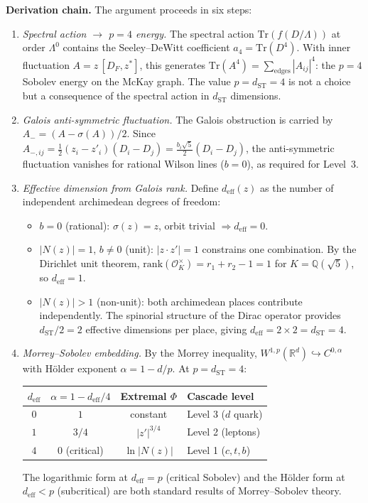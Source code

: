 \documentclass[12pt,a4paper]{article}
\theoremstyle{definition}
\begin{document}
\textbf{Derivation chain.}  The argument proceeds in six steps:

\begin{enumerate}
\item[(A)] \emph{Spectral action $\to$ $p = 4$ energy.}  The spectral action $\mathrm{Tr}(f(D/\Lambda))$ at order $\Lambda^0$ contains the Seeley--DeWitt coefficient $a_4 = \mathrm{Tr}(D^4)$.  With inner fluctuation $A = z\,[D_F, z^*]$, this generates $\mathrm{Tr}(A^4) = \sum_{\text{edges}} |A_{ij}|^4$: the $p = 4$ Sobolev energy on the McKay graph.  The value $p = d_{\text{ST}} = 4$ is not a choice but a consequence of the spectral action in $d_{\text{ST}}$ dimensions.

\item[(B)] \emph{Galois anti-symmetric fluctuation.}  The Galois obstruction is carried by $A_- = (A - \sigma(A))/2$.  Since $A_{-,ij} = \tfrac{1}{2}(z_i - z'_i)(D_i - D_j) = \tfrac{b_i\sqrt{5}}{2}(D_i - D_j)$, the anti-symmetric fluctuation vanishes for rational Wilson lines ($b = 0$), as required for Level~3.

\item[(C)] \emph{Effective dimension from Galois rank.}  Define $d_{\text{eff}}(z)$ as the number of independent archimedean degrees of freedom:
\begin{itemize}
\item $b = 0$ (rational): $\sigma(z) = z$, orbit trivial $\Rightarrow d_{\text{eff}} = 0$.
\item $|N(z)| = 1$, $b \neq 0$ (unit): $|z \cdot z'| = 1$ constrains one combination.  By the Dirichlet unit theorem, $\mathrm{rank}(\mathcal{O}_K^\times) = r_1 + r_2 - 1 = 1$ for $K = \mathbb{Q}(\sqrt{5})$, so $d_{\text{eff}} = 1$.
\item $|N(z)| > 1$ (non-unit): both archimedean places contribute independently.  The spinorial structure of the Dirac operator provides $d_{\text{ST}}/2 = 2$ effective dimensions per place, giving $d_{\text{eff}} = 2 \times 2 = d_{\text{ST}} = 4$.
\end{itemize}

\item[(D)] \emph{Morrey--Sobolev embedding.}  By the Morrey inequality, $W^{1,p}(\mathbb{R}^d) \hookrightarrow C^{0,\alpha}$ with H\"{o}lder exponent $\alpha = 1 - d/p$.  At $p = d_{\text{ST}} = 4$:
\begin{center}
\begin{tabular}{cccl}
\toprule
$d_{\text{eff}}$ & $\alpha = 1 - d_{\text{eff}}/4$ & Extremal $\Phi$ & Cascade level \\
\midrule
$0$ & $1$ & constant & Level 3 ($d$ quark) \\
$1$ & $3/4$ & $|z'|^{3/4}$ & Level 2 (leptons) \\
$4$ & $0$ (critical) & $\ln|N(z)|$ & Level 1 ($c,t,b$) \\
\bottomrule
\end{tabular}
\end{center}
The logarithmic form at $d_{\text{eff}} = p$ (critical Sobolev) and the H\"{o}lder form at $d_{\text{eff}} < p$ (subcritical) are both standard results of Morrey--Sobolev theory.


\end{enumerate}
\end{document}
